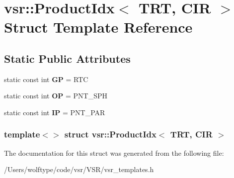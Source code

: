 \hypertarget{structvsr_1_1_product_idx_3_01_t_r_t_00_01_c_i_r_01_4}{\section{vsr\-:\-:Product\-Idx$<$ T\-R\-T, C\-I\-R $>$ Struct Template Reference}
\label{structvsr_1_1_product_idx_3_01_t_r_t_00_01_c_i_r_01_4}
}
\subsection*{Static Public Attributes}
\begin{DoxyCompactItemize}
\item 
\hypertarget{structvsr_1_1_product_idx_3_01_t_r_t_00_01_c_i_r_01_4_a8892b22cdff828caf723eecef66e0b61}{static const int {\bfseries G\-P} = R\-T\-C}\label{structvsr_1_1_product_idx_3_01_t_r_t_00_01_c_i_r_01_4_a8892b22cdff828caf723eecef66e0b61}

\item 
\hypertarget{structvsr_1_1_product_idx_3_01_t_r_t_00_01_c_i_r_01_4_a94b8e570e36830dcecd4c34257249a38}{static const int {\bfseries O\-P} = P\-N\-T\-\_\-\-S\-P\-H}\label{structvsr_1_1_product_idx_3_01_t_r_t_00_01_c_i_r_01_4_a94b8e570e36830dcecd4c34257249a38}

\item 
\hypertarget{structvsr_1_1_product_idx_3_01_t_r_t_00_01_c_i_r_01_4_a55a66219400bdfd2edf49fa79645c535}{static const int {\bfseries I\-P} = P\-N\-T\-\_\-\-P\-A\-R}\label{structvsr_1_1_product_idx_3_01_t_r_t_00_01_c_i_r_01_4_a55a66219400bdfd2edf49fa79645c535}

\end{DoxyCompactItemize}
\subsubsection*{template$<$$>$ struct vsr\-::\-Product\-Idx$<$ T\-R\-T, C\-I\-R $>$}



The documentation for this struct was generated from the following file\-:\begin{DoxyCompactItemize}
\item 
/\-Users/wolftype/code/vsr/\-V\-S\-R/vsr\-\_\-templates.\-h\end{DoxyCompactItemize}
